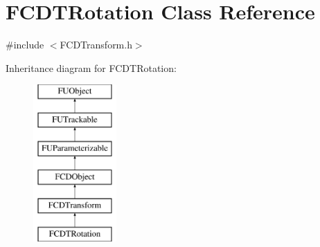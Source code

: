 \hypertarget{classFCDTRotation}{
\section{FCDTRotation Class Reference}
\label{classFCDTRotation}
}


{\ttfamily \#include $<$FCDTransform.h$>$}

Inheritance diagram for FCDTRotation:\begin{figure}[H]
\begin{center}
\leavevmode
\includegraphics[height=6.000000cm]{classFCDTRotation}
\end{center}
\end{figure}
